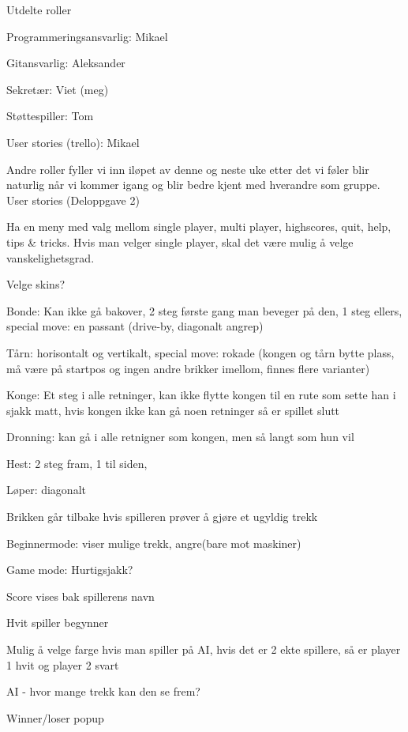 \documentclass[letterpaper,11pt]{article}
\begin{document}
Utdelte roller
\begin{list}{}{}
	\item Programmeringsansvarlig: Mikael
	\item Gitansvarlig: Aleksander
	\item Sekretær: Viet (meg)
	\item Støttespiller: Tom
	\item User stories (trello): Mikael
\end{list}

Andre roller fyller vi inn iløpet av denne og neste uke etter det vi føler blir naturlig når vi kommer igang og blir bedre kjent med hverandre som gruppe.\\

User stories (Deloppgave 2)
\begin{list}{}{}
	\item Ha en meny med valg mellom single player, multi player, highscores, quit, help, tips \& tricks. Hvis man velger single player, skal det være mulig å velge vanskelighetsgrad.
	\item Velge skins?
	\item Bonde: Kan ikke gå bakover, 2 steg første gang man beveger på den, 1 steg ellers, special move: en passant (drive-by, diagonalt angrep)
	\item Tårn: horisontalt og vertikalt, special move: rokade (kongen og tårn bytte plass, må være på startpos og ingen andre brikker imellom, finnes flere varianter)
	\item Konge: Et steg i alle retninger, kan ikke flytte kongen til en rute som sette han i sjakk matt, hvis kongen ikke kan gå noen retninger så er spillet slutt
	\item Dronning: kan gå i alle retnigner som kongen, men så langt som hun vil
	\item Hest: 2 steg fram, 1 til siden,
	\item Løper: diagonalt
	\item Brikken går tilbake hvis spilleren prøver å gjøre et ugyldig trekk
	\item Beginnermode: viser mulige trekk, angre(bare mot maskiner)
	\item Game mode: Hurtigsjakk?
	\item Score vises bak spillerens navn
	\item Hvit spiller begynner
	\item Mulig å velge farge hvis man spiller på AI, hvis det er 2 ekte spillere, så er player 1 hvit og player 2 svart
	\item AI - hvor mange trekk kan den se frem?
	\item Winner/loser popup
\end{list}
\end{document}
